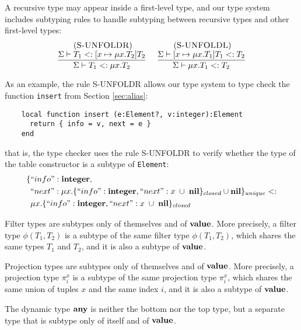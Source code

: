 A recursive type may appear inside a first-level type, and our
type system includes subtyping rules to handle subtyping between
recursive types and other first-level types:
\[
\begin{array}{c}
\begin{array}{c}
\; (\textsc{S-UNFOLDR})\\
\dfrac{\Sigma \vdash T_{1} <: [x \mapsto \mu x.T_{2}]T_{2}}
      {\Sigma \vdash T_{1} <: \mu x.T_{2}}
\end{array}
\;
\begin{array}{c}
\; (\textsc{S-UNFOLDL})\\
\dfrac{\Sigma \vdash [x \mapsto \mu x.T_{1}]T_{1} <: T_{2}}
      {\Sigma \vdash \mu x.T_{1} <: T_{2}}
\end{array}
\end{array}
\]

As an example, the rule \textsc{S-UNFOLDR} allows our type system to
type check the function \texttt{insert} from Section \ref{sec:alias}:
\begin{verbatim}
    local function insert (e:Element?, v:integer):Element
      return { info = v, next = e }
    end
\end{verbatim}
that is, the type checker uses the rule \textsc{S-UNFOLDR} to verify whether
the type of the table constructor is a subtype of \texttt{Element}:
\begin{align*}
\{ & ``info":\mathbf{integer}, \\
   & ``next":\mu x.\{``info":\mathbf{integer},
                     ``next":x \;\cup\; \mathbf{nil}\}_{closed} \cup \mathbf{nil} \}_{unique} <: \\
& \mu x.\{``info":\mathbf{integer}, ``next":x \;\cup\; \mathbf{nil}\}_{closed}
\end{align*}

Filter types are subtypes only of themselves and of $\mathbf{value}$.
More precisely, a filter type $\phi(T_{1},T_{2})$ is a subtype of
the same filter type $\phi(T_{1},T_{2})$, which shares the same
types $T_{1}$ and $T_{2}$, and it is also a subtype of $\mathbf{value}$.

Projection types are subtypes only of themselves and of $\mathbf{value}$.
More precisely, a projection type $\pi_{i}^{x}$ is a subtype of the
same projection type $\pi_{i}^{x}$, which shares the same union of
tuples $x$ and the same index $i$, and it is also a subtype of $\mathbf{value}$.

The dynamic type $\mathbf{any}$ is neither the bottom nor the top type,
but a separate type that is subtype only of itself and of $\mathbf{value}$.

